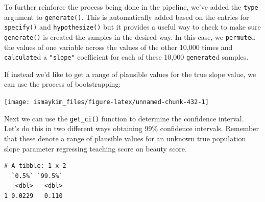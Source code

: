 \documentclass[12pt,]{krantz}
\makeatletter
\newenvironment{Shaded}{\begin{snugshade}}{\end{snugshade}}
\newcommand{\KeywordTok}[1]{\textcolor[rgb]{0.27,0.27,0.27}{\textbf{#1}}}
\newcommand{\DataTypeTok}[1]{\textcolor[rgb]{0.27,0.27,0.27}{#1}}
\newcommand{\FloatTok}[1]{\textcolor[rgb]{0.06,0.06,0.06}{#1}}
\newcommand{\StringTok}[1]{\textcolor[rgb]{0.5,0.5,0.5}{#1}}
\newcommand{\OperatorTok}[1]{\textcolor[rgb]{0.43,0.43,0.43}{\textbf{#1}}}
\newcommand{\NormalTok}[1]{#1}
\newenvironment{kframe}{%
\medskip{}
\setlength{\fboxsep}{.8em}
 \def\at@end@of@kframe{}%
 \ifinner\ifhmode%
  \def\at@end@of@kframe{\end{minipage}}%
  \begin{minipage}{\columnwidth}%
 \fi\fi%
 \def\FrameCommand##1{\hskip\@totalleftmargin \hskip-\fboxsep
 \colorbox{shadecolor}{##1}\hskip-\fboxsep
     \hskip-\linewidth \hskip-\@totalleftmargin \hskip\columnwidth}%
 \MakeFramed {\advance\hsize-\width
   \@totalleftmargin\z@ \linewidth\hsize
   \@setminipage}}%
 {\par\unskip\endMakeFramed%
 \at@end@of@kframe}
\renewenvironment{Shaded}{\begin{kframe}}{\end{kframe}}
\theoremstyle{definition}
\theoremstyle{definition}
\theoremstyle{definition}
\theoremstyle{remark}
\makeatother
\begin{document}
To further reinforce the process being done in the pipeline, we've added
the \texttt{type} argument to \texttt{generate()}. This is automatically
added based on the entries for \texttt{specify()} and
\texttt{hypothesize()} but it provides a useful way to check to make
sure \texttt{generate()} is created the samples in the desired way. In
this case, we \texttt{permute}d the values of one variable across the
values of the other 10,000 times and \texttt{calculate}d a
\texttt{"slope"} coefficient for each of these 10,000 \texttt{generate}d
samples.

If instead we'd like to get a range of plausible values for the true
slope value, we can use the process of bootstrapping:

\begin{Shaded}
\end{Shaded}

\begin{center}\texttt{[image: ismaykim\_files/figure-latex/unnamed-chunk-432-1]} \end{center}

Next we can use the \texttt{get\_ci()} function to determine the
confidence interval. Let's do this in two different ways obtaining 99\%
confidence intervals. Remember that these denote a range of plausible
values for an unknown true population slope parameter regressing
teaching score on beauty score.

\begin{Shaded}
\end{Shaded}

\begin{verbatim}
# A tibble: 1 x 2
  `0.5%` `99.5%`
   <dbl>   <dbl>
1 0.0229   0.110
\end{verbatim}

\begin{Shaded}
\end{Shaded}
\end{document}
